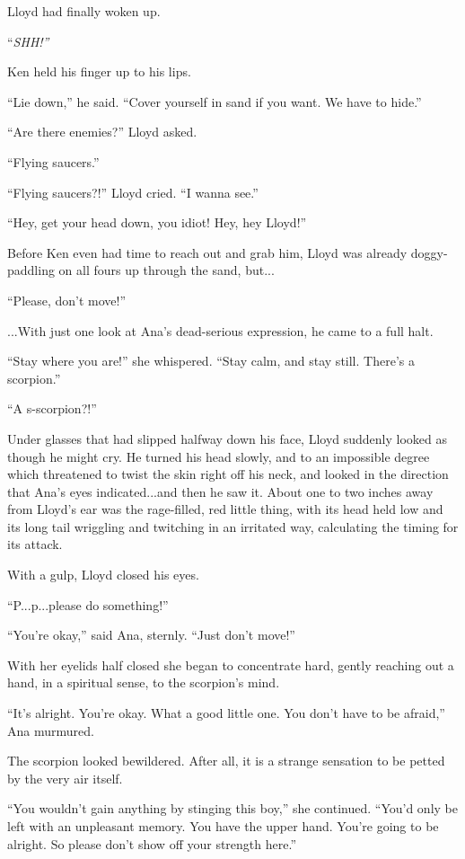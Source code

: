 \documentclass[
]{article}
\begin{document}
Lloyd had finally woken up.

``\emph{SHH!''}

Ken held his finger up to his lips.

``Lie down,'' he said. ``Cover yourself in sand if you want. We have to
hide.''

``Are there enemies?'' Lloyd asked.

``Flying saucers.''

``Flying saucers?!'' Lloyd cried. ``I wanna see.''

``Hey, get your head down, you idiot! Hey, hey Lloyd!''

Before Ken even had time to reach out and grab him, Lloyd was already
doggy-paddling on all fours up through the sand, but...

``Please, don't move!''

...With just one look at Ana's dead-serious expression, he came to a
full halt.

``Stay where you are!'' she whispered. ``Stay calm, and stay still.
There's a scorpion.''

``A s-scorpion?!''

Under glasses that had slipped halfway down his face, Lloyd suddenly
looked as though he might cry. He turned his head slowly, and to an
impossible degree which threatened to twist the skin right off his neck,
and looked in the direction that Ana's eyes indicated...and then he saw
it. About one to two inches away from Lloyd's ear was the rage-filled,
red little thing, with its head held low and its long tail wriggling and
twitching in an irritated way, calculating the timing for its attack.

With a gulp, Lloyd closed his eyes.

``P...p...please do something!''

``You're okay,'' said Ana, sternly. ``Just don't move!''

With her eyelids half closed she began to concentrate hard, gently
reaching out a hand, in a spiritual sense, to the scorpion's mind.

``It's alright. You're okay. What a good little one. You don't have to
be afraid,'' Ana murmured.

The scorpion looked bewildered. After all, it is a strange sensation to
be petted by the very air itself.

``You wouldn't gain anything by stinging this boy,'' she continued.
``You'd only be left with an unpleasant memory. You have the upper hand.
You're going to be alright. So please don't show off your strength
here.''
\end{document}
